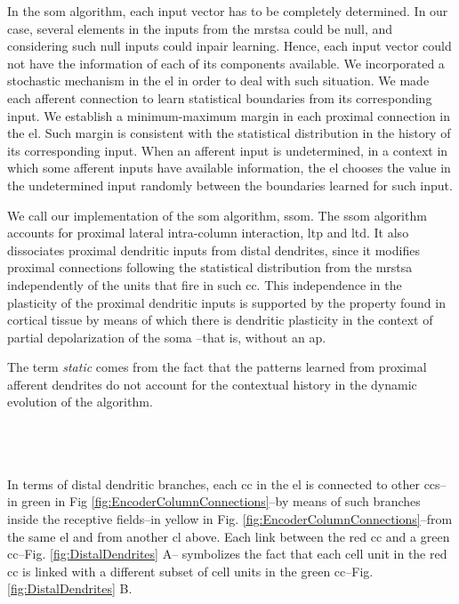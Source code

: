 \documentclass[10pt,letterpaper]{article}
\begin{document}
In the \gls{som} algorithm, each input vector has to be completely determined.
In our case, several elements in the inputs from the \gls{mrstsa} could be null,
and considering such null inputs could inpair learning. 
Hence, each input vector could not have the information of each of its components available.
We incorporated a stochastic mechanism in the \gls{el} in order to deal with such situation.
We made each afferent connection to learn statistical boundaries from its corresponding input.
We establish a minimum-maximum margin in each proximal connection in the \gls{el}.
Such margin is consistent with the statistical distribution in the history of its corresponding input.
When an afferent input is undetermined, in a context in which some afferent inputs have
available information,
the \gls{el} chooses
the value in the undetermined input
randomly
between the boundaries learned for such input.

We call our implementation of the \gls{som} algorithm, \gls{ssom}.
The \gls{ssom} algorithm accounts for proximal lateral intra-column interaction, \gls{ltp} and
\gls{ltd}.
It also dissociates proximal dendritic inputs from distal dendrites, since
it modifies
proximal connections
following the statistical distribution from the
\gls{mrstsa} independently of the units that fire in such \gls{cc}.
This independence in the plasticity of the proximal dendritic inputs
is supported by
the
property
found in cortical tissue by means of which there is dendritic plasticity
in the context of partial depolarization of the soma \cite{reiter_1998}--that is, without an \gls{ap}. %

The term \textit{static} comes from the fact that the patterns learned from proximal afferent
dendrites do not account for the contextual history in the dynamic evolution
of the algorithm.








~\\
~\\
~\\

In terms of distal dendritic branches, each \gls{cc} in the \gls{el} is connected to other \glspl{cc}--in green in Fig \ref{fig:EncoderColumnConnections}--by means of such
branches inside the receptive fields--in yellow in Fig. \ref{fig:EncoderColumnConnections}--from the same \gls{el} and from another \gls{cl}
above.
Each link between the red \gls{cc} and a green \gls{cc}--Fig. \ref{fig:DistalDendrites} A--
symbolizes the fact that each cell unit in
the red \gls{cc} is linked with a different subset of cell units in the green \gls{cc}--Fig. \ref{fig:DistalDendrites} B.
\end{document}
